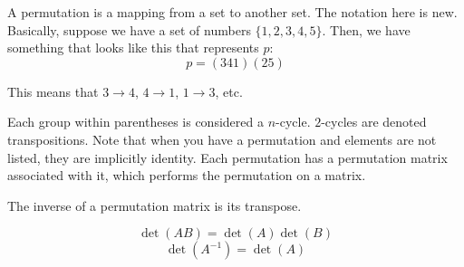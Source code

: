 \begin{definition}
  A permutation is a mapping from a set to another set. The notation here is
  new. Basically, suppose we have a set of numbers $\{1,2,3,4,5\}$. Then,
  we have something that looks like this that represents $p$:
  \[p = (341)(25)\]

  This means that $3 \rightarrow 4$, $4 \rightarrow 1$, $1 \rightarrow 3$, etc.

  Each group within parentheses is considered a $n$-cycle. $2$-cycles are
  denoted transpositions. Note that when you have a permutation and elements
  are not listed, they are implicitly identity. Each permutation has a
  permutation matrix associated with it, which performs the permutation on
  a matrix.

  The inverse of a permutation matrix is its transpose.

\end{definition}

\begin{definition}
  \[\det (AB) = \det (A) \det (B)\]
  \[\det (A^{-1}) = \det (A)\]

\end{definition}
